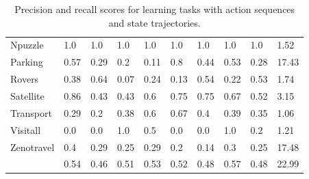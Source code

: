 \begin{table}[hbt!]
\begin{center}
\begin{footnotesize}
\begin{tabular}{l|l|l|l|l|l|l||l|l||l|}
			Npuzzle & 1.0 & 1.0 & 1.0 & 1.0 & 1.0 & 1.0 & 1.0 & 1.0& 1.52 \\ %
			Parking & 0.57 & 0.29 & 0.2 & 0.11 & 0.8 & 0.44 & 0.53 & 0.28& 17.43 \\ %
			Rovers & 0.38 & 0.64 & 0.07 & 0.24 & 0.13 & 0.54 & 0.22 & 0.53& 1.74 \\ %
			Satellite & 0.86 & 0.43 & 0.43 & 0.6 & 0.75 & 0.75 & 0.67 & 0.52& 3.15 \\ %
			Transport & 0.29 & 0.2 & 0.38 & 0.6 & 0.67 & 0.4 & 0.39 & 0.35& 1.06 \\ %
			Visitall & 0.0 & 0.0 & 1.0 & 0.5 & 0.0 & 0.0 & 1.0 & 0.2& 1.21 \\ %
			Zenotravel & 0.4 & 0.29 & 0.25 & 0.29 & 0.2 & 0.14 & 0.3 & 0.25& 17.48 \\ %
			
			\hline
			\bf & 0.54 & 0.46 & 0.51 & 0.53 & 0.52 & 0.48 & 0.57 & 0.48 & 22.99
		\end{tabular}
            \end{footnotesize}
	\end{center}
	\caption{\small Precision and recall scores for learning tasks with \NO action sequences and \NO state trajectories.}
	\label{tab:results_minimum_0_0}
\end{table}


